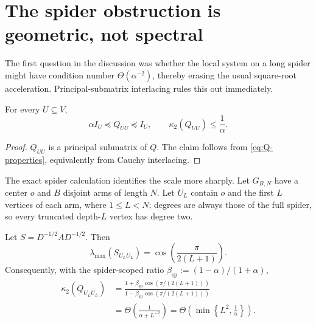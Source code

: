 \section{The spider obstruction is geometric, not spectral}
\label{sec:spider}

The first question in the discussion was whether the local system on a long
spider might have condition number $\Theta(\alpha^{-2})$, thereby erasing the
usual square-root acceleration.  Principal-submatrix interlacing rules this
out immediately.

\begin{lemma}
\label{lem:principal-conditioning}
For every $U\subseteq V$,
\begin{equation}
  \alpha I_U\preceq Q_{UU}\preceq I_U,
  \qquad
  \kappa_2(Q_{UU})\leq\frac1\alpha.
  \label{eq:principal-kappa}
\end{equation}
\end{lemma}

\begin{proof}
$Q_{UU}$ is a principal submatrix of $Q$.  The claim follows from
\cref{eq:Q-properties}, equivalently from Cauchy interlacing.
\end{proof}

The exact spider calculation identifies the scale more sharply.  Let
$G_{B,N}$ have a center $o$ and $B$ disjoint arms of length $N$.  Let $U_L$
contain $o$ and the first $L$ vertices of each arm, where $1\leq L<N$; degrees
are always those of the full spider, so every truncated depth-$L$ vertex has
degree two.

\begin{proposition}
\label{prop:spider-spectrum}
Let $S=D^{-1/2}AD^{-1/2}$.  Then
\begin{equation}
 \lambda_{\max}(S_{U_LU_L})
 =\cos\!\left(\frac{\pi}{2(L+1)}\right).
 \label{eq:spider-lambda}
\end{equation}
Consequently, with the spider-scoped ratio
$\beta_{\mathrm{sp}}:=(1-\alpha)/(1+\alpha)$,
\begin{align}
 \kappa_2(Q_{U_LU_L})
 &=\frac{1+\beta_{\mathrm{sp}}\cos(\pi/(2(L+1)))}
         {1-\beta_{\mathrm{sp}}\cos(\pi/(2(L+1)))}
 \label{eq:spider-kappa-exact}\\
 &=\Theta\!\left(\frac1{\alpha+L^{-2}}\right)
 =\Theta\!\left(\min\left\{L^2,\frac1\alpha\right\}\right).
 \label{eq:spider-kappa-asymptotic}
\end{align}
\end{proposition}

